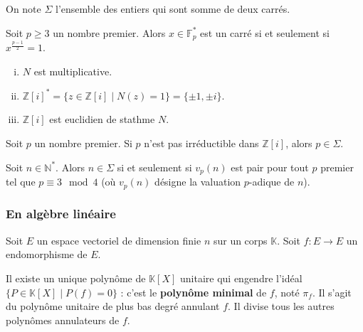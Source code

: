 	
	\begin{notation}
		On note $\Sigma$ l'ensemble des entiers qui sont somme de deux carrés.
	\end{notation}
	
	\begin{lemma}
		Soit $p \geq 3$ un nombre premier. Alors $x \in \mathbb{F}^*_p$ est un carré si et seulement si $x^{\frac{p-1}{2}} = 1$.
	\end{lemma}
	
	\begin{lemma}
		\begin{enumerate}[(i)]
			\item $N$ est multiplicative.
			\item $\mathbb{Z}[i]^* = \{ z \in \mathbb{Z}[i] \mid N(z) = 1 \} = \{ \pm 1, \pm i \}$.
			\item $\mathbb{Z}[i]$ est euclidien de stathme $N$.
		\end{enumerate}
	\end{lemma}
	
	\begin{lemma}
		Soit $p$ un nombre premier. Si $p$ n'est pas irréductible dans $\mathbb{Z}[i]$, alors $p \in \Sigma$.
	\end{lemma}
	
	
	\begin{theorem}
		Soit $n \in \mathbb{N}^*$. Alors $n \in \Sigma$ si et seulement si $v_p(n)$ est pair pour tout $p$ premier tel que $p \equiv 3 \mod 4$ (où $v_p(n)$ désigne la valuation $p$-adique de $n$).
	\end{theorem}
	
	\subsubsection{En algèbre linéaire}
	
	Soit $E$ un espace vectoriel de dimension finie $n$ sur un corps $\mathbb{K}$. Soit $f : E \rightarrow E$ un endomorphisme de $E$.
	
	
	\begin{application}
		Il existe un unique polynôme de $\mathbb{K}[X]$ unitaire qui engendre l'idéal $\{ P \in \mathbb{K}[X] \mid P(f) = 0 \}$ : c'est le \textbf{polynôme minimal} de $f$, noté $\pi_f$. Il s'agit du polynôme unitaire de plus bas degré annulant $f$. Il divise tous les autres polynômes annulateurs de $f$.
	\end{application}
	
